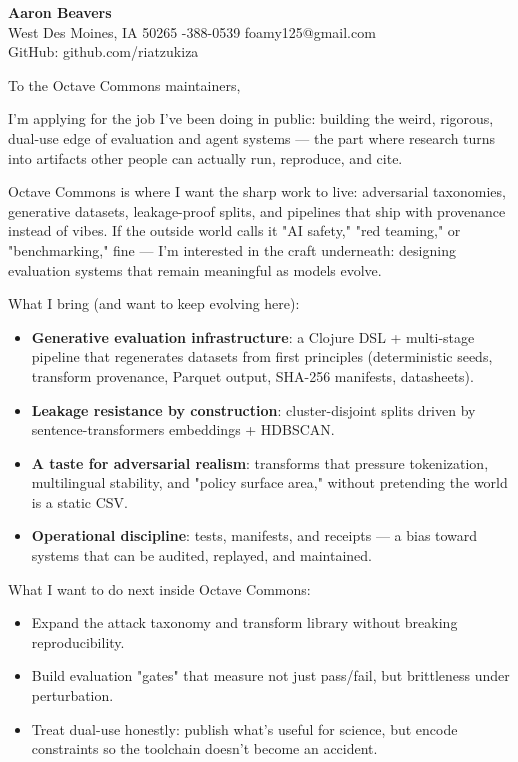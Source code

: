 \documentclass[10pt]{article}
\begin{document}
{\LARGE \textbf{Aaron Beavers}}\\
West Des Moines, IA 50265 \;\;\textbar\;-388-0539 \;\;\textbar\;\; foamy125@gmail.com\\
GitHub: github.com/riatzukiza

\vspace{10pt}
To the Octave Commons maintainers,

I'm applying for the job I've been doing in public: building the weird, rigorous, dual-use edge of evaluation and agent systems --- the part where research turns into artifacts other people can actually run, reproduce, and cite.

Octave Commons is where I want the sharp work to live: adversarial taxonomies, generative datasets, leakage-proof splits, and pipelines that ship with provenance instead of vibes. If the outside world calls it "AI safety," "red teaming," or "benchmarking," fine --- I'm interested in the craft underneath: designing evaluation systems that remain meaningful as models evolve.

What I bring (and want to keep evolving here):
\begin{itemize}
  \item \textbf{Generative evaluation infrastructure}: a Clojure DSL + multi-stage pipeline that regenerates datasets from first principles (deterministic seeds, transform provenance, Parquet output, SHA-256 manifests, datasheets).
  \item \textbf{Leakage resistance by construction}: cluster-disjoint splits driven by sentence-transformers embeddings + HDBSCAN.
  \item \textbf{A taste for adversarial realism}: transforms that pressure tokenization, multilingual stability, and "policy surface area," without pretending the world is a static CSV.
  \item \textbf{Operational discipline}: tests, manifests, and receipts --- a bias toward systems that can be audited, replayed, and maintained.
\end{itemize}

What I want to do next inside Octave Commons:
\begin{itemize}
  \item Expand the attack taxonomy and transform library without breaking reproducibility.
  \item Build evaluation "gates" that measure not just pass/fail, but brittleness under perturbation.
  \item Treat dual-use honestly: publish what's useful for science, but encode constraints so the toolchain doesn't become an accident.
\end{itemize}
\end{document}
